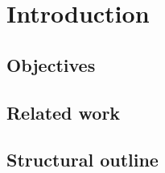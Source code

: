 {
\abnormalparskip{0pt}
\chapter{Introduction}
\label{cha:introduction}
}


\section{Objectives}
\label{sec:objectives}


\section{Related work}
\label{sec:related-work}


\section{Structural outline}
\label{sec:structural-outline}


\endChapter{}


